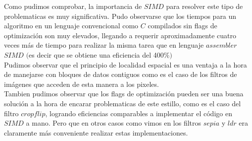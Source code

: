 Como pudimos comprobar, la importancia de $SIMD$ para resolver este tipo de problematicas es muy significativa. 
Pudo observarse que los tiempos para un algoritmo en un lenguaje convencional como $C$ compilados sin flags de optimización son muy elevados, llegando a requerir aproximadamente cuatro veces más de tiempo para realizar la misma tarea que en lenguaje $assembler$ $SIMD$ $($es decir que se obtiene una eficiencia del 400$ \% )$\\

Pudimos observar que el principio de localidad espacial es una ventaja a la hora de manejarse con bloques de datos contiguos como es el caso de los filtros de imágenes que acceden de esta manera a los pixeles.\\

Tambien pudimos observar que los flags de optimización pueden ser una buena solución a la hora de encarar problematicas de este estillo, como es el caso del filtro $cropflip$, logrando eficiencias comparables a implementar el código en $SIMD$ a mano. Pero que en otros casos como vimos en los filtros $sepia$ y $ldr$ era claramente más conveniente realizar estas implementaciones.


